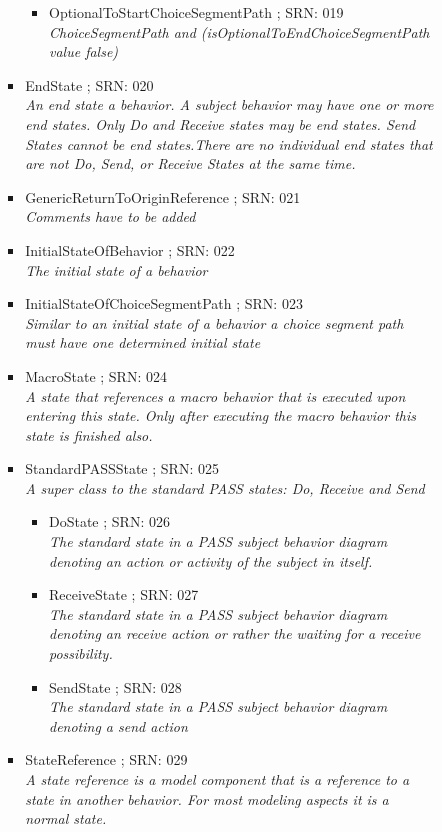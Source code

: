 \begin{itemize}
\begin{itemize}
\begin{itemize}
\begin{itemize}
\begin{itemize}
					\item OptionalToStartChoiceSegmentPath ; SRN: 019 \\ \textit{ChoiceSegmentPath and (isOptionalToEndChoiceSegmentPath value false)}
				\end{itemize}
				\item EndState ; SRN: 020 \\ \textit{An end state a behavior. A subject behavior may have one or more end states. Only Do and Receive states may be end states. Send States cannot be end states.There are no individual end states that are not Do, Send, or Receive States at the same time.}
				\item GenericReturnToOriginReference ; SRN: 021 \\ \textit{Comments have to be added}
				\item InitialStateOfBehavior ; SRN: 022 \\ \textit{The initial state of a behavior}
				\item InitialStateOfChoiceSegmentPath ; SRN: 023 \\ \textit{Similar to an initial state of a behavior a choice segment path must have one determined initial state}
				\item MacroState ; SRN: 024 \\ \textit{A state that references a macro behavior that is executed upon entering this state. Only after executing the macro behavior this state is finished also.}
				\item StandardPASSState ; SRN: 025 \\ \textit{A super class to the standard PASS states: Do, Receive and Send}
				\begin{itemize}
					\item DoState ; SRN: 026 \\ \textit{The standard state in a PASS subject behavior diagram denoting an action or activity of the subject in itself.}
					\item ReceiveState ; SRN: 027 \\ \textit{The standard state in a PASS subject behavior diagram denoting an receive action or rather the waiting for a receive possibility.}
					\item SendState ; SRN: 028 \\ \textit{The standard state in a PASS subject behavior diagram denoting a send action}
				\end{itemize}
				\item StateReference ; SRN: 029 \\ \textit{A state reference is a model component that is a reference to a state in another behavior. For most modeling aspects it is a normal state.}

\end{itemize}
\end{itemize}
\end{itemize}
\end{itemize}
